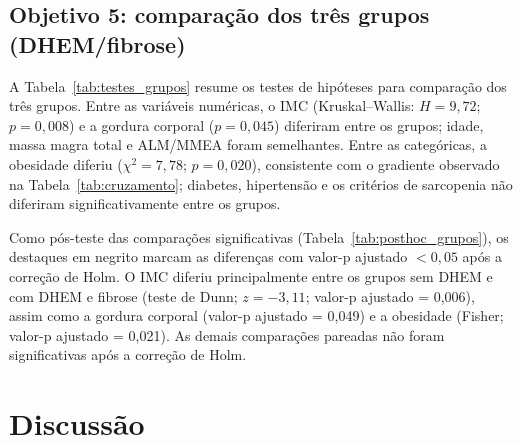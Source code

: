 \documentclass[11pt,a4paper]{article}
\begin{document}
\begin{table}[H]
  \centering
  \caption{Modelo de regressão logística múltipla para DHEM.}
  \label{tab:modelo_dhem}
  
\end{table}

\subsection{Objetivo 5: comparação dos três grupos (DHEM/fibrose)}
\label{sec:obj5}

A Tabela~\ref{tab:testes_grupos} resume os testes de hipóteses para comparação
dos três grupos. Entre as variáveis numéricas, o IMC (Kruskal--Wallis:
$H = 9{,}72$; $p = 0{,}008$) e a gordura corporal ($p = 0{,}045$) diferiram
entre os grupos; idade, massa magra total e ALM/MMEA foram semelhantes. Entre
as categóricas, a obesidade diferiu
($\chi^2 = 7{,}78$; $p = 0{,}020$), consistente com o gradiente observado na
Tabela~\ref{tab:cruzamento}; diabetes, hipertensão e os critérios de sarcopenia
não diferiram significativamente entre os grupos.



Como pós-teste das comparações significativas
(Tabela~\ref{tab:posthoc_grupos}), os destaques em negrito marcam as diferenças
com valor-p ajustado $< 0{,}05$ após a correção de Holm. O IMC diferiu
principalmente entre os grupos sem DHEM e com DHEM e fibrose (teste de Dunn;
$z = -3{,}11$; valor-p ajustado = 0{,}006), assim como a gordura corporal
(valor-p ajustado = 0{,}049) e a obesidade (Fisher; valor-p ajustado = 0{,}021).
As demais comparações pareadas não foram significativas após a correção de Holm.

\begin{table}[H]
  \centering
  \caption{Comparações post-hoc das variáveis com diferença significativa entre
           os três grupos (correção de Holm).}
  \label{tab:posthoc_grupos}
  
\end{table}

\section{Discussão}
\label{sec:discussao}
\end{document}
